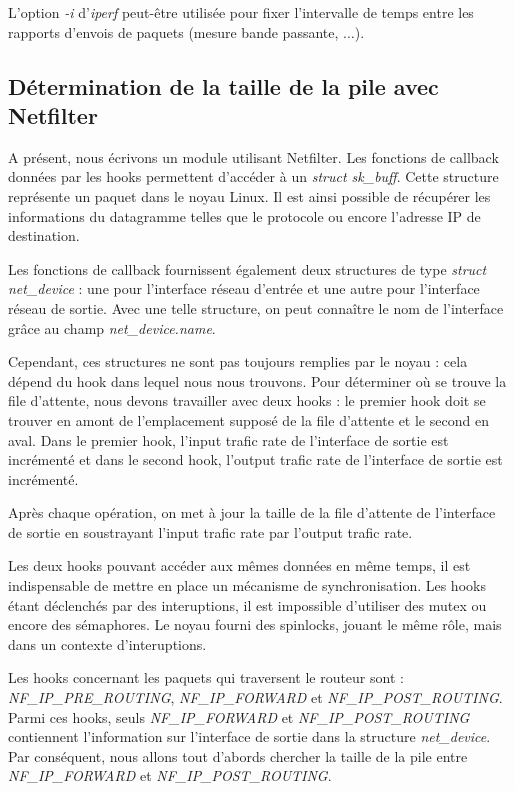 \documentclass[a4paper]{article}
\begin{document}
L'option \textit{-i} d'\textit{iperf} peut-être utilisée
pour fixer l'intervalle de temps entre les rapports
d'envois de paquets (mesure bande passante, $\ldots$).

\subsection{Détermination de la taille de la pile avec Netfilter}
A présent, nous écrivons un module utilisant Netfilter. Les
fonctions de callback données par les hooks permettent
d'accéder à un \textit{struct sk\_buff}. Cette structure représente
un paquet dans le noyau Linux. Il est ainsi possible de récupérer
les informations du datagramme telles que le protocole ou encore
l'adresse IP de destination.

Les fonctions de callback fournissent également deux structures
de type \textit{struct net\_device} : une pour l'interface réseau
d'entrée et une autre pour l'interface réseau de sortie. Avec
une telle structure, on peut connaître le nom de l'interface
grâce au champ \textit{net\_device.name}.

Cependant, ces structures ne sont pas toujours remplies par
le noyau : cela dépend du hook dans lequel nous nous trouvons.
Pour déterminer où se trouve la file d'attente, nous devons
travailler avec deux hooks : le premier hook doit se trouver
en amont de l'emplacement supposé de la file d'attente et le second
 en aval. Dans le premier hook, l'input trafic rate de l'interface
 de sortie est incrémenté et dans le second hook, l'output trafic
 rate de l'interface de sortie est incrémenté.
 
Après chaque opération, on met à jour la taille de la file
d'attente de l'interface de sortie en soustrayant l'input trafic
rate par l'output trafic rate.

Les deux hooks pouvant accéder aux mêmes données en même temps,
il est indispensable de mettre en place un mécanisme de
synchronisation. Les hooks étant déclenchés par des interuptions,
il est impossible d'utiliser des mutex ou encore des sémaphores.
Le noyau fourni des spinlocks, jouant le même  rôle, mais dans
un contexte d'interuptions.

Les hooks concernant les paquets qui traversent le routeur sont :
\textit{NF\_IP\_PRE\_ROUTING}, \textit{NF\_IP\_FORWARD} et
\textit{NF\_IP\_POST\_ROUTING}. Parmi ces hooks, seuls
\textit{NF\_IP\_FORWARD} et \textit{NF\_IP\_POST\_ROUTING}
contiennent l'information sur l'interface de sortie dans la
structure \textit{net\_device}. Par conséquent, nous allons
tout d'abords chercher la taille de la pile entre
\textit{NF\_IP\_FORWARD} et \textit{NF\_IP\_POST\_ROUTING}.
\end{document}
